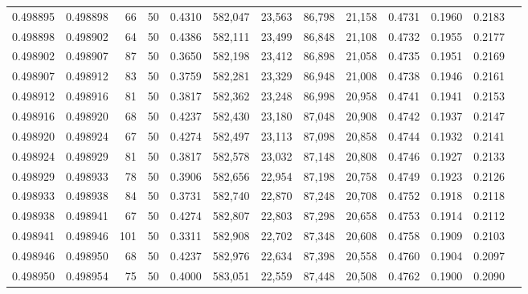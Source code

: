\begin{tabular}{rrrrrrrrrrrrr}
0.498895 & 0.498898 &    66 &  50 &                                     0.4310 & 582,047 &  23,563 &  86,798 &  21,158 & 0.4731 & 0.1960 & 0.2183 \\
0.498898 & 0.498902 &    64 &  50 &                                     0.4386 & 582,111 &  23,499 &  86,848 &  21,108 & 0.4732 & 0.1955 & 0.2177 \\
0.498902 & 0.498907 &    87 &  50 &                                     0.3650 & 582,198 &  23,412 &  86,898 &  21,058 & 0.4735 & 0.1951 & 0.2169 \\
0.498907 & 0.498912 &    83 &  50 &                                     0.3759 & 582,281 &  23,329 &  86,948 &  21,008 & 0.4738 & 0.1946 & 0.2161 \\
0.498912 & 0.498916 &    81 &  50 &                                     0.3817 & 582,362 &  23,248 &  86,998 &  20,958 & 0.4741 & 0.1941 & 0.2153 \\
0.498916 & 0.498920 &    68 &  50 &                                     0.4237 & 582,430 &  23,180 &  87,048 &  20,908 & 0.4742 & 0.1937 & 0.2147 \\
0.498920 & 0.498924 &    67 &  50 &                                     0.4274 & 582,497 &  23,113 &  87,098 &  20,858 & 0.4744 & 0.1932 & 0.2141 \\
0.498924 & 0.498929 &    81 &  50 &                                     0.3817 & 582,578 &  23,032 &  87,148 &  20,808 & 0.4746 & 0.1927 & 0.2133 \\
0.498929 & 0.498933 &    78 &  50 &                                     0.3906 & 582,656 &  22,954 &  87,198 &  20,758 & 0.4749 & 0.1923 & 0.2126 \\
0.498933 & 0.498938 &    84 &  50 &                                     0.3731 & 582,740 &  22,870 &  87,248 &  20,708 & 0.4752 & 0.1918 & 0.2118 \\
0.498938 & 0.498941 &    67 &  50 &                                     0.4274 & 582,807 &  22,803 &  87,298 &  20,658 & 0.4753 & 0.1914 & 0.2112 \\
0.498941 & 0.498946 &   101 &  50 &                                     0.3311 & 582,908 &  22,702 &  87,348 &  20,608 & 0.4758 & 0.1909 & 0.2103 \\
0.498946 & 0.498950 &    68 &  50 &                                     0.4237 & 582,976 &  22,634 &  87,398 &  20,558 & 0.4760 & 0.1904 & 0.2097 \\
0.498950 & 0.498954 &    75 &  50 &                                     0.4000 & 583,051 &  22,559 &  87,448 &  20,508 & 0.4762 & 0.1900 & 0.2090 \\

\end{tabular}
